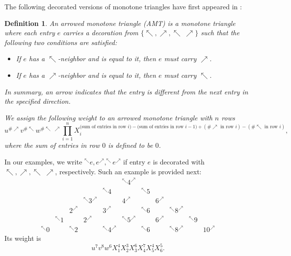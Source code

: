 \documentclass[12pt]{amsart}
\newtheorem{definition}[theorem]{Definition}
\theoremstyle{definition}
\numberwithin{equation}{section}
\newcommand{\nenwarrow}{\nwarrow \!\!\!\!\!\;\!\! \nearrow}
\begin{document}
The following decorated versions of monotone triangles have first appeared in \cite{nASMDPP}:
\begin{definition} 
\label{AMT}
An \emph{arrowed monotone triangle} (AMT) is a monotone triangle where each entry $e$ carries a decoration from $\{\nwarrow, \nearrow, \nenwarrow \}$ such that the following two conditions are satisfied: 
\begin{itemize} 
\item If $e$ has a $\nwarrow$-neighbor and is equal to it, then $e$ must carry  $\nearrow$.
\item If $e$ has a $\nearrow$-neighbor and is equal to it, then $e$ must carry $\nwarrow$. 
\end{itemize}
In summary, an arrow indicates that the entry is different from the next entry in the specified direction.

We assign the following weight to an arrowed monotone triangle with $n$ rows 
\begin{equation*}
u^{\# \nearrow} v^{\# \nwarrow} w^{\# \nenwarrow} \prod_{i=1}^n X_i^{\text{(sum of entries in row $i$)}-\text{(sum of entries in row $i-1$)}+(\# \nearrow \text{ in row $i$}) - (\# \nwarrow \text{ in row $i$})},
\end{equation*}
where the sum of entries in row $0$ is defined to be $0$.
\end{definition}

In our examples, we write $^{\nwarrow} e, e^{\nearrow}, ^{\nwarrow}e^{\nearrow}$ if entry $e$ is decorated with 
$\nwarrow, \nearrow, \nenwarrow$, respectively.
Such an example is provided next:
\[
\begin{array}{ccccccccccccccccc}
  &   &   &   &   &   &   &   & ^{\nwarrow}4^{\nearrow} &   &   &   &   &   &   &   & \\
  &   &   &   &   &   &   & ^{\nwarrow}4 &   & ^{\nwarrow}5 &   &   &   &   &   &   & \\
  &   &   &   &   &   & ^{\nwarrow}3^{\nearrow} &   & 4^{\nearrow} &   & {6}^{\nearrow} &   &   &   &   &   & \\
  &   &   &   &   & 2^{\nearrow} &   & 3^{\nearrow} &   & ^{\nwarrow}{6} &   & ^{\nwarrow}8^{\nearrow} &   &   &   &   & \\
  &   &   &   & ^{\nwarrow}1 &   & 2^{\nearrow} &  &   ^{\nwarrow}5^{\nearrow} &   & 6^{\nearrow}   &  & ^{\nwarrow}9  &   &   &   & \\
  &   &   & ^{\nwarrow}0 &   & ^{\nwarrow}2 &   & ^{\nwarrow}4^{\nearrow} &   & ^{\nwarrow}6  &   & ^{\nwarrow}8^{\nearrow} &   & 10^{\nearrow} &   &   &
\end{array}
\]
Its weight is 
\begin{equation*}
u^7 v^8 w^6 X_1^{4} X_2^{3} X_3^{6} X_4^{7} X_5^{4} X_6^{5}.
\end{equation*}
\end{document}
